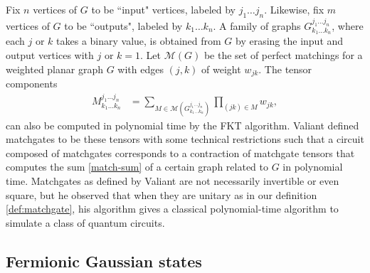 Fix $n$ vertices of $G$ to be ``input" vertices, labeled by $j_1 \dots j_n$. Likewise, fix $m$ vertices of $G$ to be ``outputs", labeled by $k_1 \dots k_n$. A family of graphs  $G^{j_1 \dots j_n}_{k_1 \dots k_n}$, where each $j$ or $k$ takes a binary value, is obtained from $G$ by erasing the input and output vertices with $j$ or $k=1$. Let $\mathcal{M}(G)$ be the set of perfect matchings for a weighted planar graph $G$ with edges $(j,k)$ of weight $w_{jk}$. The tensor components
\begin{align}\label{match-sum}
M^{j_1 \dots j_n}_{k_1 \dots k_n} &= \sum_{M \in \mathcal{M}\left( G^{j_1 \dots j_n}_{k_1 \dots k_n} \right)} \prod_{(jk) \in M} w_{jk},
\end{align}
can also be computed in polynomial time by the FKT algorithm. Valiant defined matchgates to be these tensors with some technical restrictions such that a circuit composed of matchgates corresponds to a contraction of matchgate tensors that computes the sum \eqref{match-sum} of a certain graph related to $G$ in polynomial time. Matchgates as defined by Valiant are not necessarily invertible or even square, but he observed that when they are unitary as in our definition \eqref{def:matchgate}, his algorithm gives a classical polynomial-time algorithm to simulate a class of quantum circuits.

\subsection{Fermionic Gaussian states}\label{ch5:gaussian}

